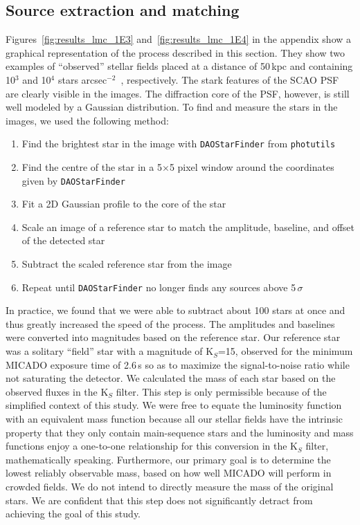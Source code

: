 \documentclass{aa}
\newcommand{\sig}{$\sigma$~}
\newcommand{\spa}{stars arcsec$^{-2}$~}
\begin{document}
\subsection{Source extraction and matching}
\label{subsec:source_extraction}

Figures~\ref{fig:results_lmc_1E3} and~\ref{fig:results_lmc_1E4} in the appendix show a graphical representation of the process described in this section.
They show two examples of ``observed'' stellar fields placed at a distance of 50\,kpc and containing 10$^3$ and 10$^4$ \spa , respectively.
The stark features of the SCAO PSF are clearly visible in the images.
The diffraction core of the PSF, however, is still well modeled by a Gaussian distribution.
To find and measure the stars in the images, we used the following method:

\begin{enumerate}
    \item Find the brightest star in the image with \verb+DAOStarFinder+ from \verb+photutils+~\citep{photutils}
    \item Find the centre of the star in a 5$\times$5 pixel window around the coordinates given by \verb+DAOStarFinder+
    \item Fit a 2D Gaussian profile to the core of the star
    \item Scale an image of a reference star to match the amplitude, baseline, and offset of the detected star
    \item Subtract the scaled reference star from the image
    \item Repeat until \verb+DAOStarFinder+ no longer finds any sources above 5\,\sig
\end{enumerate}

In practice, we found that we were able to subtract about 100 stars at once and thus greatly increased the speed of the process.
The amplitudes and baselines were converted into magnitudes based on the reference star.
Our reference star was a solitary ``field'' star with a magnitude of K$_S$=15, observed for the minimum {MICADO} exposure time of 2.6\,s so as to maximize the signal-to-noise ratio while not saturating the detector.
We calculated the mass of each star based on the observed fluxes in the K$_S$ filter.
This step is only permissible because of the simplified context of this study.
We were free to equate the luminosity function with an equivalent mass function because all our stellar fields have the intrinsic property that they only contain main-sequence stars and the luminosity and mass functions enjoy a one-to-one relationship for this conversion in the K$_S$ filter, mathematically speaking.
Furthermore, our primary goal is to determine the lowest reliably observable mass, based on how well MICADO will perform in crowded fields. We do not intend to directly measure the mass of the original stars.
We are confident that this step does not significantly detract from achieving the goal of this study.
\end{document}
